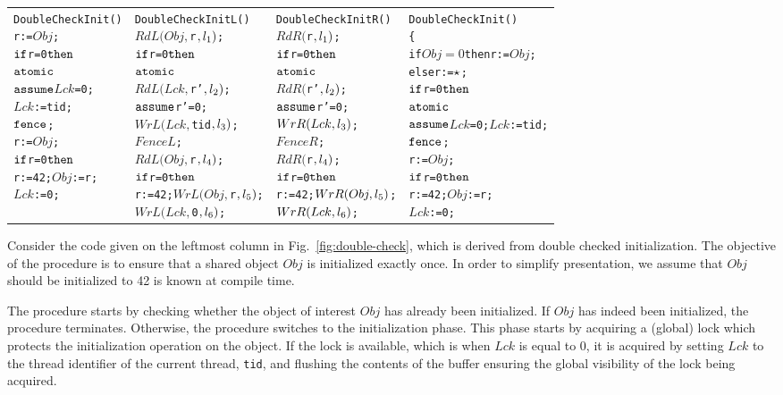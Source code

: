 \begin{figure*}[ht]
{\small
\begin{tabular}{p{}|p{}p{}|p{}}
\begin{alltt}DoubleCheckInit() 
 r:=\(Obj\);
 \(\aliif\) r=0 \(\alithen\) 
   \(\aliatomic\)  
     \(\aliassume\) {\(Lck\)=0}; 
     \(Lck\):=tid; 
     \(\alifence\); 
  r:=\(Obj\);
  \(\aliif\) r=0 \(\alithen\) 
    r:=42; \(Obj\):=r;
  \(Lck\):=0;\end{alltt}
&
\begin{alltt}DoubleCheckInitL()
 \(RdL(Obj,\)r\(,l\sb{1})\);
 \(\aliif\) r=0 \(\alithen\) 
   \(\aliatomic\)  
     \(RdL(Lck,\)r'\(,l\sb{2})\); 
     \(\aliassume\) {r'=0}; 
     \(WrL(Lck,\)tid\(,l\sb{3})\); 
     \(FenceL\); 
  \(RdL(Obj,\)r\(,l\sb{4})\);
  \(\aliif\) r=0 \(\alithen\) 
    r:=42; \(WrL(Obj,\)r\(,l\sb{5})\);
  \(WrL(Lck,\)0\(,l\sb{6})\);\end{alltt}
&
\begin{alltt}DoubleCheckInitR()
 \(RdR(\)r\(,l\sb{1})\);
 \(\aliif\) r=0 \(\alithen\) 
   \(\aliatomic\)  
     \(RdR(\)r'\(,l\sb{2})\); 
     \(\aliassume\) {r'=0}; 
     \(WrR(Lck,l\sb{3})\); 
     \(FenceR\); 
  \(RdR(\)r\(,l\sb{4})\);
  \(\aliif\) r=0 \(\alithen\) 
    r:=42; \(WrR(Obj,l\sb{5})\);
  \(WrR(Lck,l\sb{6})\);\end{alltt}
&
\begin{alltt}DoubleCheckInit() 
\{
 if \(Obj=0\) then r:=\(Obj\);
 else r:=\(\alihavocval\);
 \(\aliif\) r=0 \(\alithen\) 
   \(\aliatomic\) 
     \(\aliassume\) {\(Lck\)=0}; \(Lck\):=tid; 
     \(\alifence\);
  r:=\(Obj\);
  \(\aliif\) r=0 \(\alithen\) 
    r:=42; \(Obj\):=r;
  \(Lck\):=0;\end{alltt}
\end{tabular}
}
\caption{The code for double check initialization; its transformed SC-equivalent transformation; abstracted TRF code.}
\label{fig:double-check}
\end{figure*}

Consider the code given on the leftmost column in Fig.~\ref{fig:double-check}, which is derived from double checked initialization.
The objective of the procedure is to ensure that a shared object $Obj$ is initialized exactly once.
In order to simplify presentation, we assume that $Obj$ should be initialized to 42 is known at compile time.

The procedure starts by checking whether the object of interest $Obj$ has already been initialized.
If $Obj$ has indeed been initialized, the procedure terminates.
Otherwise, the procedure switches to the initialization phase.
This phase starts by acquiring a (global) lock which protects the initialization operation on the object.
If the lock is available, which is when $Lck$ is equal to 0, it is acquired by setting $Lck$ to the thread identifier of the current thread, {\tt tid}, and flushing the contents of the buffer ensuring the global visibility of the lock being acquired.

